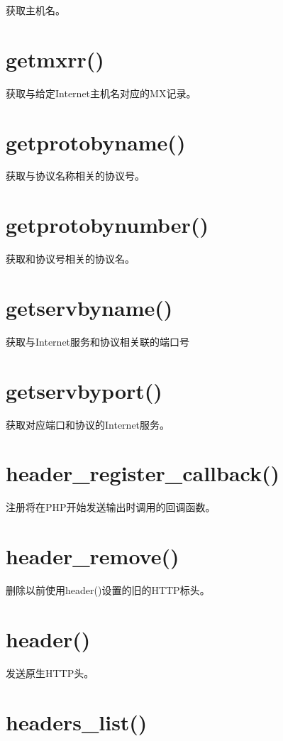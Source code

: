 获取主机名。

\section{getmxrr()}

获取与给定Internet主机名对应的MX记录。

\section{getprotobyname()}

获取与协议名称相关的协议号。

\section{getprotobynumber()}

获取和协议号相关的协议名。

\section{getservbyname()}

获取与Internet服务和协议相关联的端口号

\section{getservbyport()}

获取对应端口和协议的Internet服务。

\section{header\_register\_callback()}

注册将在PHP开始发送输出时调用的回调函数。

\section{header\_remove()}

删除以前使用header()设置的旧的HTTP标头。


\section{header()}

发送原生HTTP头。

\section{headers\_list()}


